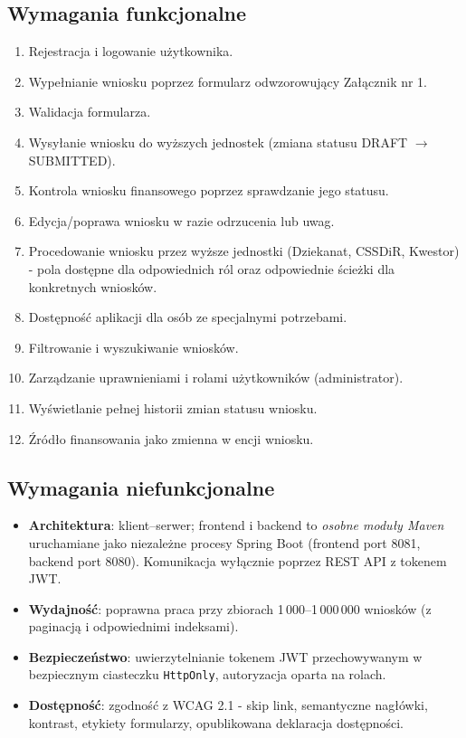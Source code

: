 \documentclass[12pt,a4paper]{article}
\begin{document}
\subsection{Wymagania funkcjonalne}
\begin{enumerate}[leftmargin=*]
  \item Rejestracja i logowanie użytkownika.
  \item Wypełnianie wniosku poprzez formularz odwzorowujący Załącznik nr 1.
  \item Walidacja formularza.
  \item Wysyłanie wniosku do wyższych jednostek (zmiana statusu DRAFT $\to$ SUBMITTED).
  \item Kontrola wniosku finansowego poprzez sprawdzanie jego statusu.
  \item Edycja/poprawa wniosku w razie odrzucenia lub uwag.
  \item Procedowanie wniosku przez wyższe jednostki (Dziekanat, CSSDiR, Kwestor) - pola
        dostępne dla odpowiednich ról oraz odpowiednie ścieżki dla konkretnych wniosków.
  \item Dostępność aplikacji dla osób ze specjalnymi potrzebami.
  \item Filtrowanie i wyszukiwanie wniosków.
  \item Zarządzanie uprawnieniami i rolami użytkowników (administrator).
  \item Wyświetlanie pełnej historii zmian statusu wniosku.
  \item Źródło finansowania jako zmienna w encji wniosku.
\end{enumerate}

\subsection{Wymagania niefunkcjonalne}
\begin{itemize}[leftmargin=*]
  \item \textbf{Architektura}: klient--serwer; frontend i backend to
        \emph{osobne moduły Maven} uruchamiane jako niezależne procesy
        Spring Boot (frontend port 8081, backend port 8080). Komunikacja
        wyłącznie poprzez REST API z tokenem JWT.
  \item \textbf{Wydajność}: poprawna praca przy zbiorach 1\,000--1\,000\,000 wniosków
        (z paginacją i odpowiednimi indeksami).
  \item \textbf{Bezpieczeństwo}: uwierzytelnianie tokenem JWT przechowywanym w bezpiecznym
        ciasteczku \texttt{HttpOnly}, autoryzacja oparta na rolach.
  \item \textbf{Dostępność}: zgodność z WCAG 2.1 - skip link, semantyczne nagłówki,
        kontrast, etykiety formularzy, opublikowana deklaracja dostępności.
\end{itemize}
\end{document}
